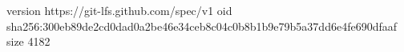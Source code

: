 version https://git-lfs.github.com/spec/v1
oid sha256:300eb89de2cd0dad0a2be46e34ceb8c04c0b8b1b9e79b5a37dd6e4fe690dfaaf
size 4182
